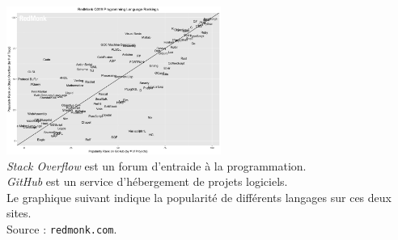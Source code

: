\begin{center}
    \includegraphics[width=7cm]{img/rank.png}\\ \scriptsize    \textit{Stack Overflow} est un forum d'entraide à la programmation.\\ \textit{GitHub} est un service d'hébergement de projets logiciels.\\
    Le graphique suivant indique la popularité de différents langages sur ces deux sites.\\
    Source : \texttt{redmonk.com}.
\end{center}
